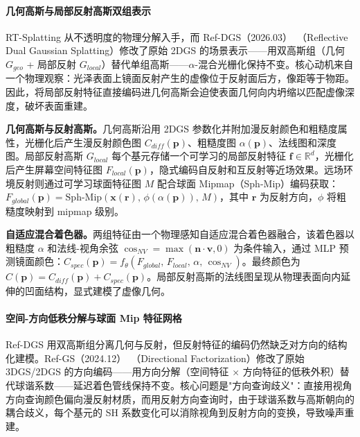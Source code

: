 \paragraph{几何高斯与局部反射高斯双组表示}

RT-Splatting 从不透明度的物理分解入手，而 Ref-DGS（2026.03）~\cite{2603_07664}（Reflective Dual Gaussian Splatting）修改了原始 2DGS 的场景表示——用双高斯组（几何 $G_{geo}$ + 局部反射 $G_{local}$）替代单组高斯——$\alpha$-混合光栅化保持不变。核心动机来自一个物理观察：光泽表面上镜面反射产生的虚像位于反射面后方，像距等于物距。因此，将局部反射特征直接编码进几何高斯会迫使表面几何向内坍缩以匹配虚像深度，破坏表面重建。

\textbf{几何高斯与反射高斯。}几何高斯沿用 2DGS 参数化并附加漫反射颜色和粗糙度属性，光栅化后产生漫反射颜色图 $C_{diff}(\mathbf{p})$、粗糙度图 $\alpha(\mathbf{p})$、法线图和深度图。局部反射高斯 $G_{local}$ 每个基元存储一个可学习的局部反射特征 $\mathbf{f}\in\mathbb{R}^d$，光栅化后产生屏幕空间特征图 $F_{local}(\mathbf{p})$，隐式编码自反射和互反射等近场效果。远场环境反射则通过可学习球面特征图 $M$ 配合球面 Mipmap（Sph-Mip）编码获取：$F_{global}(\mathbf{p})=\text{Sph-Mip}(\mathbf{x}(\mathbf{r}),\,\phi(\alpha(\mathbf{p})),\,M)$，其中 $\mathbf{r}$ 为反射方向，$\phi$ 将粗糙度映射到 mipmap 级别。

\textbf{自适应混合着色器。}两组特征由一个物理感知自适应混合着色器融合，该着色器以粗糙度 $\alpha$ 和法线-视角余弦 $\cos_{NV}=\max(\mathbf{n}\cdot\mathbf{v},0)$ 为条件输入，通过 MLP 预测镜面颜色：$C_{spec}(\mathbf{p})=f_\theta(F_{global},\,F_{local},\,\alpha,\,\cos_{NV})$。最终颜色为 $C(\mathbf{p})=C_{diff}(\mathbf{p})+C_{spec}(\mathbf{p})$。局部反射高斯的法线图呈现从物理表面向内延伸的凹面结构，显式建模了虚像几何。

\paragraph{空间-方向低秩分解与球面 Mip 特征网格}

Ref-DGS 用双高斯组分离几何与反射，但反射特征的编码仍然缺乏对方向的结构化建模。Ref-GS（2024.12）~\cite{2412_00905}（Directional Factorization）修改了原始 3DGS/2DGS 的方向编码——用方向分解（空间特征 $\times$ 方向特征的低秩外积）替代球谐系数——延迟着色管线保持不变。核心问题是"方向查询歧义"：直接用视角方向查询颜色偏向漫反射材质，而用反射方向查询时，由于球谐系数与高斯朝向的耦合歧义，每个基元的 SH 系数变化可以消除视角到反射方向的变换，导致噪声重建。

